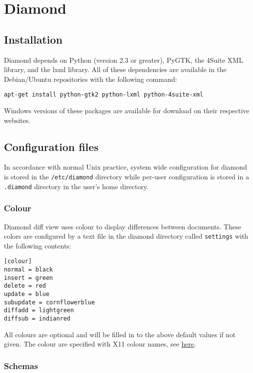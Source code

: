 \chapter{Diamond}\label{chap:diamond}

\section{Installation}
Diamond depends on Python (version 2.3 or greater), PyGTK,
the 4Suite XML library, and the lxml library. All of these dependencies
are available in the Debian/Ubuntu repositories with the following command:
\begin{verbatim}
apt-get install python-gtk2 python-lxml python-4suite-xml
\end{verbatim}

Windows versions of these packages are available for download on their respective websites.

\section{Configuration files}

In accordance with normal Unix practice, system wide configuration for
diamond is stored in the \verb+/etc/diamond+ directory while per-user
configuration is stored in a \verb+.diamond+ directory in the user's home
directory.

\subsection{Colour}\label{sec:colour}

Diamond diff view uses colour to display differences between documents.
These colors are configured by a text file in the diamond directory called \verb+settings+
with the following contents:
\begin{verbatim}
[colour]
normal = black
insert = green
delete = red
update = blue
subupdate = cornflowerblue
diffadd = lightgreen
diffsub = indianred
\end{verbatim}
All colours are optional and will be filled in to the above default values if not given.
The colour are specified with X11 colour names, see \href{http://en.wikipedia.org/wiki/X11_color_names}{here}.

\subsection{Schemas}


